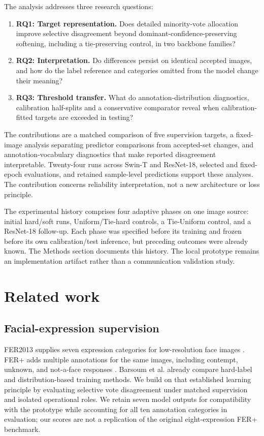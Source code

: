 \documentclass[pdflatex,sn-mathphys-num]{sn-jnl}
\begin{document}
The analysis addresses three research questions:
\begin{enumerate}
\item \textbf{RQ1: Target representation.} Does detailed minority-vote allocation improve selective disagreement beyond dominant-confidence-preserving softening, including a tie-preserving control, in two backbone families?
\item \textbf{RQ2: Interpretation.} Do differences persist on identical accepted images, and how do the label reference and categories omitted from the model change their meaning?
\item \textbf{RQ3: Threshold transfer.} What do annotation-distribution diagnostics, calibration half-splits and a conservative comparator reveal when calibration-fitted targets are exceeded in testing?
\end{enumerate}

The contributions are a matched comparison of five supervision targets, a fixed-image analysis separating predictor comparisons from accepted-set changes, and annotation-vocabulary diagnostics that make reported disagreement interpretable. Twenty-four runs across Swin-T and ResNet-18, selected and fixed-epoch evaluations, and retained sample-level predictions support these analyses. The contribution concerns reliability interpretation, not a new architecture or loss principle.

The experimental history comprises four adaptive phases on one image source: initial hard/soft runs, Uniform/Tie-hard controls, a Tie-Uniform control, and a ResNet-18 follow-up. Each phase was specified before its training and frozen before its own calibration/test inference, but preceding outcomes were already known. The Methods section documents this history. The local prototype remains an implementation artifact rather than a communication validation study.

\section{Related work}
\subsection{Facial-expression supervision}
FER2013 supplies seven expression categories for low-resolution face images \cite{goodfellow2013fer}. FER+ adds multiple annotations for the same images, including contempt, unknown, and not-a-face responses \cite{barsoum2016ferplus}. Barsoum et al. already compare hard-label and distribution-based training methods. We build on that established learning principle by evaluating selective vote disagreement under matched supervision and isolated operational roles. We retain seven model outputs for compatibility with the prototype while accounting for all ten annotation categories in evaluation; our scores are not a replication of the original eight-expression FER+ benchmark.
\end{document}
